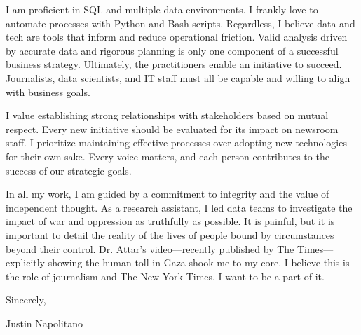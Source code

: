 \documentclass{cover-letter-class}
\begin{document}
{    \vspace{1em}

    I am proficient in SQL and multiple data environments. I frankly love to automate processes with Python and Bash scripts. Regardless, I believe data and tech are tools that inform and reduce operational friction. Valid analysis driven by accurate data and rigorous planning is only one component of a successful business strategy. Ultimately, the practitioners enable an initiative to succeed. Journalists, data scientists, and IT staff must all be capable and willing to align with business goals.

    
    \vspace{1em}

    I value establishing strong relationships with stakeholders based on mutual respect. Every new initiative should be evaluated for its impact on newsroom staff. I prioritize maintaining effective processes over adopting new technologies for their own sake. Every voice matters, and each person contributes to the success of our strategic goals.

    
    \vspace{1em}

    In all my work, I am guided by a commitment to integrity and the value of independent thought. As a research assistant, I led data teams to investigate the impact of war and oppression as truthfully as possible. It is painful, but it is important to detail the reality of the lives of people bound by circumstances beyond their control. Dr. Attar's video—recently published by The Times—explicitly showing the human toll in Gaza shook me to my core. I believe this is the role of journalism and The New York Times. I want to be a part of it.

    \vspace{1em}

    \noindent
    Sincerely,

    \vspace{1em}

    \noindent
    Justin Napolitano
}
\end{document}
